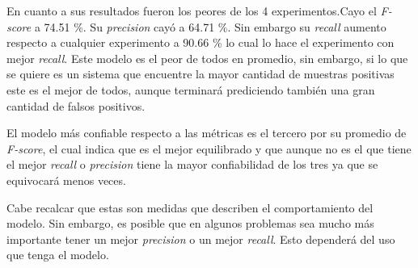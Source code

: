 		\par En cuanto a sus resultados fueron los peores de los 4 experimentos.Cayo el \textit{F-score} a 74.51 \%. Su \textit{precision} cayó a 64.71 \%. Sin embargo su \textit{recall} aumento respecto a cualquier experimento a 90.66 \% lo cual lo hace el experimento con mejor \textit{recall}. Este modelo es el peor de todos en promedio, sin embargo, si lo que se quiere es un sistema que encuentre la mayor cantidad de muestras positivas este es el mejor de todos, aunque terminará prediciendo también una gran cantidad de falsos positivos. 
		
		\par El modelo más confiable respecto a las métricas es el tercero por su  promedio de \textit{F-score}, el cual indica que es el mejor equilibrado y que aunque  no es el que tiene el mejor \textit{recall} o \textit{precision} tiene la mayor confiabilidad de los tres ya que se equivocará menos veces. 
		
		\par Cabe recalcar que estas son medidas que describen el comportamiento del modelo. Sin embargo, es posible que en algunos problemas sea mucho más importante tener un mejor \textit{precision} o un mejor \textit{recall}. Esto dependerá del uso que tenga el modelo.
		
